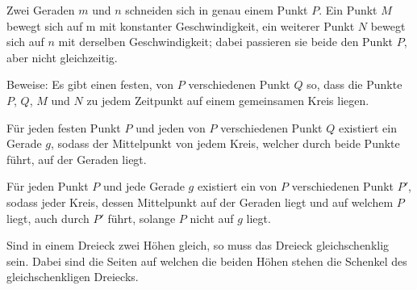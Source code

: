 \documentclass[10pt, a4paper, reqno]{amsart}
\begin{document}
\newpage
\begin{aufgabe}
  Zwei Geraden $m$ und $n$ schneiden sich in genau einem Punkt $P$. Ein Punkt
  $M$ bewegt sich auf m mit konstanter Geschwindigkeit, ein weiterer Punkt $N$
  bewegt sich auf $n$ mit derselben Geschwindigkeit; dabei passieren sie beide
  den Punkt $P$, aber nicht gleichzeitig.
 
  Beweise: Es gibt einen festen, von $P$ verschiedenen Punkt $Q$ so, dass die
  Punkte
  $P$, $Q$, $M$ und $N$ zu jedem Zeitpunkt auf einem gemeinsamen Kreis liegen.\\
\end{aufgabe}
\begin{lemma}\label{sec3:lemma1}
  Für jeden festen Punkt $P$ und jeden von $P$ verschiedenen Punkt $Q$ existiert ein Gerade $g$, sodass
  der Mittelpunkt von jedem Kreis, welcher durch beide Punkte führt, auf der
  Geraden liegt.
\end{lemma}
\begin{lemma}\label{sec3:lemma3}
  Für jeden Punkt $P$ und jede Gerade $g$ existiert ein von $P$ verschiedenen Punkt $P'$, sodass jeder
  Kreis, dessen Mittelpunkt auf der Geraden liegt und auf welchem $P$ liegt,
  auch durch $P'$ führt, solange $P$ nicht auf $g$ liegt.
\end{lemma}
\begin{lemma}\label{sec3:lemma2}
  Sind in einem Dreieck zwei Höhen gleich, so muss das Dreieck gleichschenklig
  sein. Dabei sind die Seiten auf welchen die beiden Höhen stehen die Schenkel des
  gleichschenkligen Dreiecks.
\end{lemma}
\end{document}

